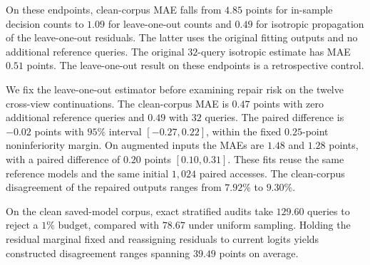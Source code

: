 On these endpoints, clean-corpus MAE falls from $4.85$ points for
in-sample decision counts to $1.09$ for leave-one-out counts and $0.49$
for isotropic propagation of the leave-one-out residuals. The latter uses
the original fitting outputs and no additional reference queries. The
original $32$-query isotropic estimate has MAE $0.51$ points. The
leave-one-out result on these endpoints is a retrospective control.

We fix the leave-one-out estimator before examining repair risk on the
twelve cross-view continuations. The clean-corpus MAE is $0.47$ points
with zero additional reference queries and $0.49$ with $32$ queries.
The paired difference is $-0.02$ points with $95\%$ interval
$[-0.27,0.22]$, within the fixed $0.25$-point noninferiority margin.
On augmented inputs the MAEs are $1.48$ and $1.28$ points, with a paired
difference of $0.20$ points $[0.10,0.31]$. These fits reuse the same
reference models and the same initial $1{,}024$ paired accesses. The
clean-corpus disagreement of the repaired outputs ranges from
$7.92\%$ to $9.30\%$.

On the clean saved-model corpus, exact stratified audits take $129.60$
queries to reject a $1\%$ budget, compared with $78.67$ under uniform
sampling. Holding the residual marginal fixed and reassigning residuals
to current logits yields constructed disagreement ranges spanning
$39.49$ points on average.
